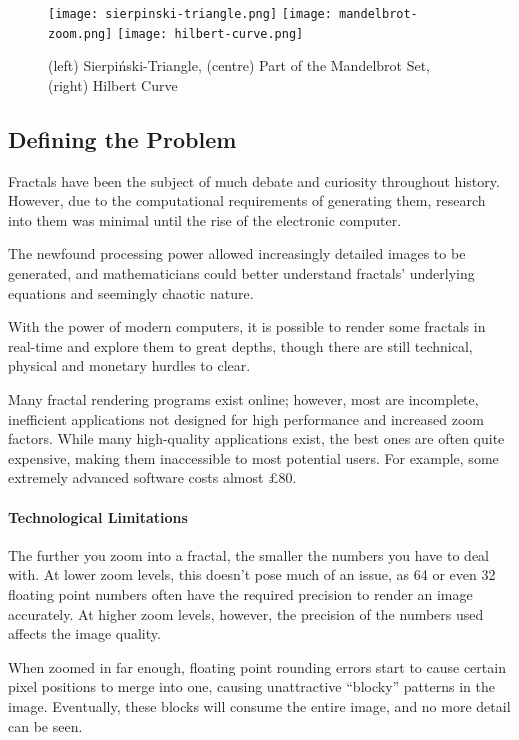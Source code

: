 \begin{figure}[htp]
	\centering
	\texttt{[image: sierpinski-triangle.png]}\hfill
	\texttt{[image: mandelbrot-zoom.png]}\hfill
	\texttt{[image: hilbert-curve.png]}
	
	\caption{(left) Sierpiński-Triangle, (centre) Part of the Mandelbrot Set, (right) Hilbert Curve}
\end{figure}

\subsection{Defining the Problem}

Fractals have been the subject of much debate and curiosity throughout history. However, due to the computational requirements of generating them, research into them was minimal until the rise of the electronic computer.

The newfound processing power allowed increasingly detailed images to be generated, and mathematicians could better understand fractals' underlying equations and seemingly chaotic nature.

With the power of modern computers, it is possible to render some fractals in real-time and explore them to great depths, though there are still technical, physical and monetary hurdles to clear.

Many fractal rendering programs exist online; however, most are incomplete, inefficient applications not designed for high performance and increased zoom factors. While many high-quality applications exist, the best ones are often quite expensive, making them inaccessible to most potential users. For example, some extremely advanced software costs almost \(\pounds 80\)\cite{slijkerman_2022}.
	
\paragraph{Technological Limitations} The further you zoom into a fractal, the smaller the numbers you have to deal with. At lower zoom levels, this doesn't pose much of an issue, as \SI{64}{\bit} or even \SI{32}{\bit} floating point numbers often have the required precision to render an image accurately. At higher zoom levels, however, the precision of the numbers used affects the image quality.

When zoomed in far enough, floating point rounding errors start to cause certain pixel positions to merge into one, causing unattractive ``blocky'' patterns in the image. Eventually, these blocks will consume the entire image, and no more detail can be seen.

